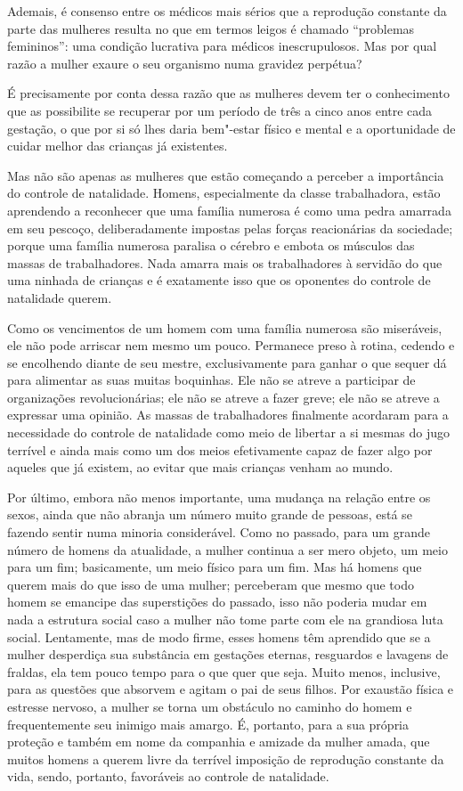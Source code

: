 Ademais, é consenso entre os médicos mais sérios que a reprodução
constante da parte das mulheres resulta no que em termos leigos é
chamado ``problemas femininos'': uma condição lucrativa para médicos
inescrupulosos. Mas por qual razão a mulher exaure o seu organismo numa
gravidez perpétua?

É precisamente por conta dessa razão que as mulheres devem ter o
conhecimento que as possibilite se recuperar por um período de três a
cinco anos entre cada gestação, o que por si só lhes daria bem"-estar
físico e mental e a oportunidade de cuidar melhor das crianças já
existentes.

Mas não são apenas as mulheres que estão começando a perceber a
importância do controle de natalidade. Homens, especialmente da classe
trabalhadora, estão aprendendo a reconhecer que uma família numerosa é
como uma pedra amarrada em seu pescoço, deliberadamente impostas
pelas forças reacionárias da sociedade; porque uma família numerosa
paralisa o cérebro e embota os músculos das massas de trabalhadores.
Nada amarra mais os trabalhadores à servidão do que uma ninhada de
crianças e é exatamente isso que os oponentes do controle de natalidade
querem.

Como os vencimentos de um homem com uma família numerosa são miseráveis,
ele não pode arriscar nem mesmo um pouco. Permanece preso à
rotina, cedendo e se encolhendo diante de seu mestre, exclusivamente para
ganhar o que sequer dá para alimentar as suas muitas boquinhas. Ele não se
atreve a participar de organizações revolucionárias; ele não se atreve a
fazer greve; ele não se atreve a expressar uma opinião. As massas de
trabalhadores finalmente acordaram para a necessidade do controle de
natalidade como meio de libertar a si mesmas do jugo terrível e ainda
mais como um dos meios efetivamente capaz de fazer algo por aqueles que já existem, ao evitar que mais crianças venham ao mundo.

Por último, embora não menos importante, uma mudança na relação entre os
sexos, ainda que não abranja um número muito grande de pessoas, está se
fazendo sentir numa minoria considerável. Como no passado, para um
grande número de homens da atualidade, a mulher continua a ser mero
objeto, um meio para um fim; basicamente, um meio físico para um fim.
Mas há homens que querem mais do que isso de uma mulher; perceberam que
mesmo que todo homem se emancipe das superstições do passado, isso não
poderia mudar em nada a estrutura social caso a mulher não tome parte
com ele na grandiosa luta social. Lentamente, mas de modo firme, esses
homens têm aprendido que se a mulher desperdiça sua substância em
gestações eternas, resguardos e lavagens de fraldas, ela tem pouco tempo
para o que quer que seja. Muito menos, inclusive, para as questões que
absorvem e agitam o pai de seus filhos. Por exaustão física e estresse
nervoso, a mulher se torna um obstáculo no caminho do homem e
frequentemente seu inimigo mais amargo. É, portanto, para a sua própria
proteção e também em nome da companhia e amizade da mulher amada, que
muitos homens a querem livre da terrível imposição de reprodução
constante da vida, sendo, portanto, favoráveis ao controle de
natalidade.

